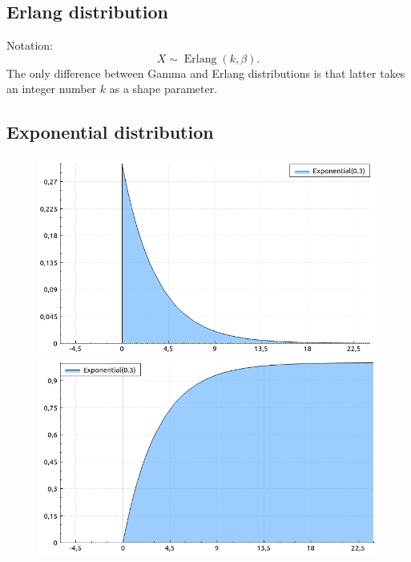 \documentclass[a4paper,11pt]{article}
\theoremstyle{plain}
\theoremstyle{definition}
\begin{document}
	\subsection{Erlang distribution}
	Notation:
	\[
	X \sim \operatorname{Erlang}(k, \beta).
	\]
	The only difference between Gamma and Erlang distributions is that latter takes an integer number $k$ as a shape parameter.
	
	\subsection{Exponential distribution}
	\begin{figure}[!htb]\centering
		\begin{minipage}{0.55\textwidth}
			\includegraphics[width=\linewidth, right]{exponential_pdf}
			\captionsetup{labelformat=empty}
			\includegraphics[width=\linewidth, right]{exponential_cdf}
			\captionsetup{labelformat=empty}
		\end{minipage}
		\begin{minipage}{0.4\textwidth}
		\begin{tabular}{| r | l |}

\end{tabular}
\end{minipage}
\end{figure}
\end{document}
